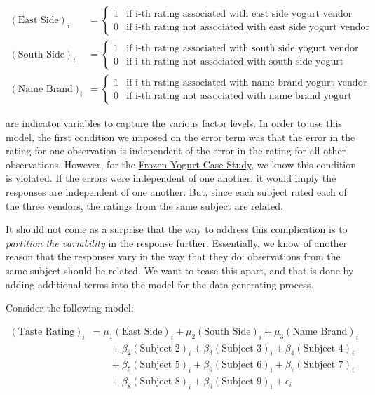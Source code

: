 \documentclass[]{book}
\theoremstyle{plain}
\theoremstyle{mydefn}
\theoremstyle{myexmpl}
\theoremstyle{remark}
\begin{document}
\[
\begin{aligned}
  (\text{East Side})_i &= \begin{cases}
    1 & \text{if i-th rating associated with east side yogurt vendor} \\
    0 & \text{if i-th rating not associated with east side yogurt vendor}
    \end{cases} \\
  (\text{South Side})_i &= \begin{cases}
    1 & \text{if i-th rating associated with south side yogurt vendor} \\
    0 & \text{if i-th rating not associated with south side yogurt vendor}
    \end{cases} \\
  (\text{Name Brand})_i &= \begin{cases}
    1 & \text{if i-th rating associated with name brand yogurt vendor} \\
    0 & \text{if i-th rating not associated with name brand yogurt vendor}
    \end{cases}
\end{aligned}
\]

are indicator variables to capture the various factor levels. In order
to use this model, the first condition we imposed on the error term was
that the error in the rating for one observation is independent of the
error in the rating for all other observations. However, for the
\protect\hyperlink{CaseYogurt}{Frozen Yogurt Case Study}, we know this
condition is violated. If the errors were independent of one another, it
would imply the responses are independent of one another. But, since
each subject rated each of the three vendors, the ratings from the same
subject are related.

It should not come as a surprise that the way to address this
complication is to \emph{partition the variability} in the response
further. Essentially, we know of another reason that the responses vary
in the way that they do: observations from the same subject should be
related. We want to tease this apart, and that is done by adding
additional terms into the model for the data generating process.

Consider the following model:

\[
\begin{aligned}
  (\text{Taste Rating})_i &= \mu_1 (\text{East Side})_i + \mu_2 (\text{South Side})_i + \mu_3 (\text{Name Brand})_i \\
    &\qquad + \beta_2 (\text{Subject 2})_i + \beta_3 (\text{Subject 3})_i + \beta_4 (\text{Subject 4})_i \\
    &\qquad + \beta_5 (\text{Subject 5})_i + \beta_6 (\text{Subject 6})_i + \beta_7 (\text{Subject 7})_i \\
    &\qquad + \beta_8 (\text{Subject 8})_i + \beta_9 (\text{Subject 9})_i + \epsilon_i
\end{aligned}
\]
\end{document}
